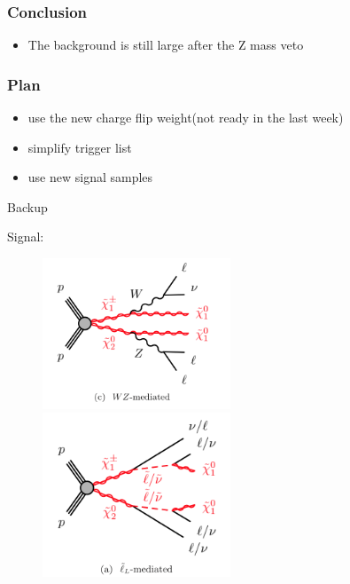 \documentclass[mathserif,serif]{beamer}
\begin{document}
%

\begin{frame}
\frametitle{Conclusion}
\begin{itemize}
\item The background is still large after the Z mass veto
\end{itemize}
\end{frame}

\begin{frame}
\frametitle{Plan}
\begin{itemize}
\item use the new charge flip weight(not ready in the last week)
\item simplify trigger list
\item use new signal samples
\end{itemize}
\end{frame}

\begin{frame}
\begin{center}
\huge
Backup
\end{center}
\end{frame}

\begin{frame}
\small
Signal:\\
\begin{figure}
\includegraphics[width=0.5\textwidth]{data/WZ.png}
\includegraphics[width=0.5\textwidth]{data/slepton.png}
\end{figure}
\end{frame}
\end{document}
